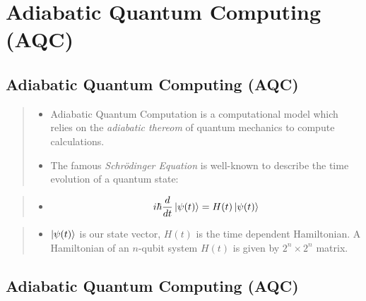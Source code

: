\documentclass[
]{article}
\providecommand{\tightlist}{%
  \setlength{\itemsep}{0pt}\setlength{\parskip}{0pt}}
\begin{document}
\hypertarget{adiabatic-quantum-computing-aqc}{%
\section{Adiabatic Quantum Computing
(AQC)}\label{adiabatic-quantum-computing-aqc}}

\hypertarget{adiabatic-quantum-computing-aqc-1}{%
\subsection{Adiabatic Quantum Computing
(AQC)}\label{adiabatic-quantum-computing-aqc-1}}

\begin{quote}
\begin{itemize}
\tightlist
\item
  Adiabatic Quantum Computation is a computational model which relies on
  the \emph{adiabatic thereom} of quantum mechanics to compute
  calculations.
\item
  The famous \emph{Schrödinger Equation} is well-known to describe the
  time evolution of a quantum state:
\end{itemize}
\end{quote}

\begin{quote}
\begin{itemize}
\tightlist
\item
  \[
  i\hbar \frac{d}{dt} \ket{\psi (t)} = H(t) \ket{\psi(t)}
  \]
\end{itemize}
\end{quote}

\begin{quote}
\begin{itemize}
\tightlist
\item
  \(\ket{\psi(t)}\) is our state vector, \(H(t)\) is the time dependent
  Hamiltonian. A Hamiltonian of an \(n\)-qubit system \(H(t)\) is given
  by \(2^n \times 2^n\) matrix.
\end{itemize}
\end{quote}

\hypertarget{adiabatic-quantum-computing-aqc-2}{%
\subsection{Adiabatic Quantum Computing
(AQC)}\label{adiabatic-quantum-computing-aqc-2}}
\end{document}

